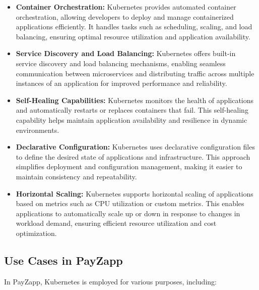 \documentclass[12pt,a4paper]{report}
\begin{document}
\begin{itemize}
    \item \textbf{Container Orchestration:} Kubernetes provides automated container orchestration, allowing developers to deploy and manage containerized applications efficiently. It handles tasks such as scheduling, scaling, and load balancing, ensuring optimal resource utilization and application availability.
    
    \item \textbf{Service Discovery and Load Balancing:} Kubernetes offers built-in service discovery and load balancing mechanisms, enabling seamless communication between microservices and distributing traffic across multiple instances of an application for improved performance and reliability.
    
    \item \textbf{Self-Healing Capabilities:} Kubernetes monitors the health of applications and automatically restarts or replaces containers that fail. This self-healing capability helps maintain application availability and resilience in dynamic environments.
    
    \item \textbf{Declarative Configuration:} Kubernetes uses declarative configuration files to define the desired state of applications and infrastructure. This approach simplifies deployment and configuration management, making it easier to maintain consistency and repeatability.
    
    \item \textbf{Horizontal Scaling:} Kubernetes supports horizontal scaling of applications based on metrics such as CPU utilization or custom metrics. This enables applications to automatically scale up or down in response to changes in workload demand, ensuring efficient resource utilization and cost optimization.
\end{itemize}

\subsection{Use Cases in PayZapp}

In PayZapp, Kubernetes is employed for various purposes, including:
\end{document}
